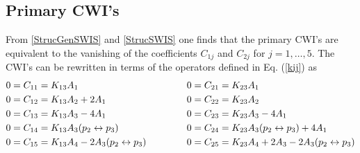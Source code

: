 \documentclass[a4paper,11pt,openright,twoside]{book}
\numberwithin{equation}{section}
\begin{document}
{{{\subsection{Primary CWI's}
\label{primsection}
From \eqref{StrucGenSWIS} and \eqref{StrucSWIS} one finds that the primary CWI's are equivalent to the vanishing of the coefficients $C_{1j}$ and $C_{2j}$ for $j=1,\dots, 5$.  The CWI's can be rewritten in terms of the operators defined in Eq.  (\ref{kij}) as
\begin{equation}
	\begin{split}
		0&=C_{11}=K_{13}A_1\\
		0&=C_{12}=K_{13}A_2+2A_1\\
		0&=C_{13}=K_{13}A_3-4A_1\\
		0&=C_{14}=K_{13}A_3(p_2\leftrightarrow p_3)\\
		0&=C_{15}=K_{13}A_4-2A_3(p_2\leftrightarrow p_3)
	\end{split}
	\hspace{1.5cm}
	\begin{split}
		0&=C_{21}=K_{23}A_1\\
		0&=C_{22}=K_{23}A_2\\
		0&=C_{23}=K_{23}A_3-4A_1\\
		0&=C_{24}=K_{23}A_3(p_2\leftrightarrow p_3)+4A_1\\
		0&=C_{25}=K_{23}A_4+2A_3-2A_3(p_2\leftrightarrow p_3)
	\end{split}\label{Primary}
\end{equation}

}}}
\end{document}
